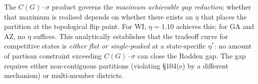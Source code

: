 \begin{corollary}
The $C(G) \cdot \sigma$ product governs the \emph{maximum achievable gap
reduction}; whether that maximum is realised depends on whether there exists
an $\eta$ that places the partition at the topological flip point.
For WI, $\eta = 1.10$ achieves this; for GA and AZ, no $\eta$ suffices.
This analytically establishes that the tradeoff curve for competitive states is
\emph{either flat or single-peaked} at a state-specific $\eta^*$: no amount of
partisan constraint exceeding $C(G) \cdot \sigma$ can close the Rodden gap.
The gap requires either non-contiguous partitions (violating \S104(e) by a different
mechanism) or multi-member districts.
\end{corollary}
